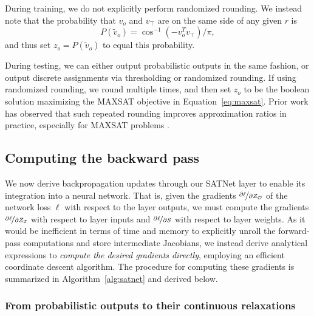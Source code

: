 \documentclass{article}
\newcommand{\outdex}{o}
\newcommand{\truthvar}{\top}
\newcommand{\inset}{\mathcal{I}}
\newcommand{\outset}{\mathcal{O}}
\begin{document}
	During training, we do not explicitly perform randomized rounding.
	We instead note that the probability that $v_{\outdex}$ and $v_{\truthvar}$ are on the same side of any given $r$ is
	\begin{equation}
		\label{eq:rr-prob}
		P(\tilde{v}_{\outdex}) = \cos^{-1}(-v_{\outdex}^T v_{\truthvar})/\pi,
	\end{equation}
	and thus set $z_{\outdex} = P(\tilde{v}_{\outdex})$ to equal this probability. 
	
	During testing, we can either output probabilistic outputs in the same fashion, or output discrete assignments via thresholding or randomized rounding.
	If using randomized rounding, we round multiple times, and then
	set $z_{\outdex}$ to be the 
boolean solution maximizing the MAXSAT objective in Equation~\eqref{eq:maxsat}. 
	Prior work has observed that such repeated rounding improves approximation ratios in practice, especially for MAXSAT problems \cite{wang2018low}.


	\subsection{Computing the backward pass}
	\label{sec:backward}
	
	We now derive backpropagation updates through our SATNet layer to enable its integration into a neural network.
	That is, given the gradients $\nicefrac{\partial \ell}{\partial Z_{\outset}}$ of the network loss $\ell$ with respect to the layer outputs, we must compute the gradients $\nicefrac{\partial \ell}{\partial  Z_{\inset}}$ with respect to layer inputs and $\nicefrac{\partial \ell}{\partial S}$ with respect to layer weights.
As it would be inefficient in terms of time and memory to explicitly unroll the forward-pass computations and store intermediate Jacobians,
	we instead derive analytical expressions to \emph{compute the desired gradients directly}, employing an efficient coordinate descent algorithm.
	The procedure for computing these gradients is summarized in Algorithm~\ref{alg:satnet} and derived below.
	
	\subsubsection{From probabilistic outputs to their continuous relaxations}
	
\end{document}
